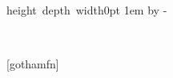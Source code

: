 {{			%
			\ifx\@thefnmark\@empty
				\insertfootnotetext\par%
			\else
				\hspace*{\gothamSideFootnoteMarkerShift}\insertfootnotemark\,\insertfootnotetext\par%
			\fi
		}%
	\else
	\setlength{\lineskip}{0.6pt}%
	\setbox\strutbox\hbox{\vrule height depth width0pt}%
	\parindent 1em\noindent%
	\raggedleft
	\advance\rightskip by -\gothamFootnoteRightShift%
	\ifx\@thefnmark\@empty
		\insertfootnotetext\par%
	\else
		\insertfootnotemark\,\insertfootnotetext\par%
	\fi
	\fi
}
\makeatother
{}[gothamfn]

